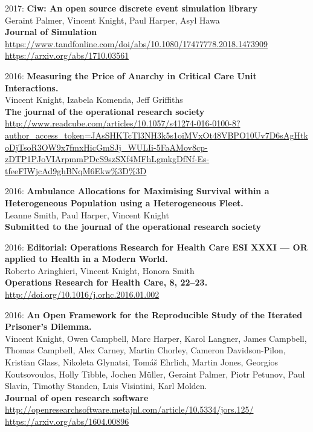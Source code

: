\documentclass[10pt]{res} %
\begin{document}
\begin{resume}
\begin{etaremune}
\item
2017: \textbf{Ciw: An open source discrete event simulation library}\\
Geraint Palmer, Vincent Knight, Paul Harper, Asyl Hawa
\\
\textbf{Journal of Simulation}
\\
\url{https://www.tandfonline.com/doi/abs/10.1080/17477778.2018.1473909}
\\
\url{https://arxiv.org/abs/1710.03561}
\\

\item
2016: \textbf{Measuring the Price of Anarchy in Critical Care Unit Interactions.}\\
Vincent Knight, Izabela Komenda, Jeff Griffiths
\\
\textbf{The journal of the operational research society}
\\
\url{http://www.readcube.com/articles/10.1057/s41274-016-0100-8?author_access_token=JAsSHKTcTl3NH3k5s1oiMVxOt48VBPO10Uv7D6sAgHtkoDjTsoR3OW9x7fmxHicGmSJj_WULIi-5FaAMov8cp-zDTP1PJoVIArpmmPDcS9szSXf4MFhLgmkgDfNf-Es-tfeeFIWjcAd9ghBNqM6Ekw%3D%3D}
\\

\item
2016: \textbf{Ambulance Allocations for Maximising Survival within a Heterogeneous Population using a Heterogeneous Fleet.}\\
Leanne Smith, Paul Harper, Vincent Knight
\\
\textbf{Submitted to the journal of the operational research society}
\\

\item
2016: \textbf{Editorial: Operations Research for Health Care ESI XXXI — OR applied to Health in a Modern World.}\\
Roberto Aringhieri, Vincent Knight, Honora Smith
\\
\textbf{Operations Research for Health Care, 8, 22–23.}
\\
\url{http://doi.org/10.1016/j.orhc.2016.01.002}
\\

\item
2016: \textbf{An Open Framework for the Reproducible Study of the Iterated Prisoner’s Dilemma.}\\
Vincent Knight, Owen Campbell, Marc Harper, Karol Langner, James Campbell, Thomas Campbell, Alex Carney, Martin Chorley, Cameron Davidson-Pilon, Kristian Glass, Nikoleta Glynatsi, Tomáš Ehrlich, Martin Jones, Georgios Koutsovoulos, Holly Tibble, Jochen Müller, Geraint Palmer, Piotr Petunov, Paul Slavin, Timothy Standen, Luis Visintini, Karl Molden.
\\
\textbf{Journal of open research software}
\\
\url{http://openresearchsoftware.metajnl.com/article/10.5334/jors.125/}
\\
\url{https://arxiv.org/abs/1604.00896}
\\


\end{etaremune}
\end{resume}
\end{document}
